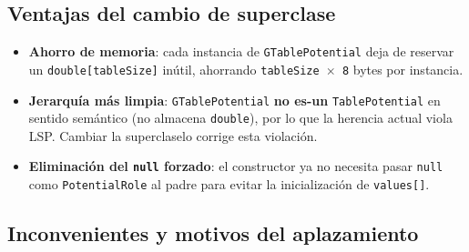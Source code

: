 \documentclass[11pt,a4paper]{article}
\newcommand{\code}[1]{\texttt{#1}}
\begin{document}
\subsection{Ventajas del cambio de superclase}
\label{sec:fase5-pros}

\begin{itemize}
  \item \textbf{Ahorro de memoria}: cada instancia de \code{GTablePotential} deja de
        reservar un \code{double[tableSize]} inútil, ahorrando
        \code{tableSize $\times$ 8} bytes por instancia.
  \item \textbf{Jerarquía más limpia}: \code{GTablePotential} \textbf{no es-un}
        \code{TablePotential} en sentido semántico (no almacena \code{double}),
        por lo que la herencia actual viola LSP.  Cambiar la superclaselo corrige esta
        violación.
  \item \textbf{Eliminación del \code{null} forzado}: el constructor ya no
        necesita pasar \code{null} como \code{PotentialRole} al padre para evitar
        la inicialización de \code{values[]}.
\end{itemize}

\subsection{Inconvenientes y motivos del aplazamiento}
\end{document}
